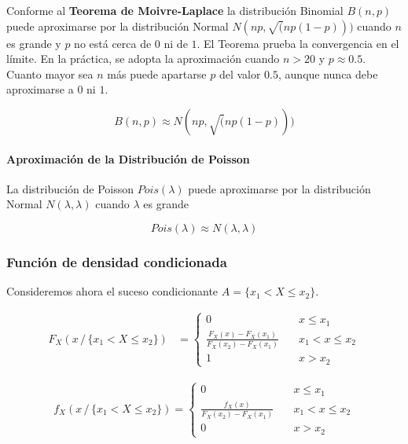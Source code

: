 \documentclass[11pt]{article}
\begin{document}
Conforme al \textbf{Teorema de Moivre-Laplace} la distribución Binomial
\(B(n,p)\) puede aproximarse por la distribución Normal
\(N(np, \sqrt(np(1-p)))\) cuando \(n\) es grande y \(p\) no está cerca
de \(0\) ni de \(1\). El Teorema prueba la convergencia en el límite. En
la práctica, se adopta la aproximación cuando \(n >20\) y
\(p \approx 0.5\). Cuanto mayor sea \(n\) más puede apartarse \(p\) del
valor \(0.5\), aunque nunca debe aproximarse a \(0\) ni \(1\).

\[B(n,p) \approx N(np, \sqrt(np(1-p)))\]

\hypertarget{aproximaciuxf3n-de-la-distribuciuxf3n-de-poisson}{%
\paragraph{Aproximación de la Distribución de
Poisson}\label{aproximaciuxf3n-de-la-distribuciuxf3n-de-poisson}}

La distribución de Poisson \(Pois(\lambda)\) puede aproximarse por la
distribución Normal \(N(\lambda, \lambda)\) cuando \(\lambda\) es grande

\[Pois(\lambda) \approx N(\lambda, \lambda)\]

    \hypertarget{funciuxf3n-de-densidad-condicionada}{%
\subsubsection*{Función de densidad
condicionada}\label{funciuxf3n-de-densidad-condicionada}}

Consideremos ahora el suceso condicionante \(A=\{x_1<X\leq x_2\}\).

\begin{align*}
F_X(x\, /\, \{x_1 < X \leq x_2\}) & = 
\begin{cases}
    0       & \quad x \leq x_1\\
    \frac{F_X(x)-F_X(x_1)}{F_X(x_2)-F_X(x_1)}  & \quad x_1 < x \leq x_2\\
    1 &\quad x > x_2
  \end{cases}
\end{align*}

\begin{align*}
f_X(x\, /\, \{x_1 < X \leq x_2\}) = \begin{cases}
    0       & \quad x \leq x_1\\
    \frac{f_X(x)}{F_X(x_2)-F_X(x_1)}  & \quad x_1 < x \leq x_2\\
    0 &\quad x > x_2
  \end{cases}
\end{align*}
\end{document}
